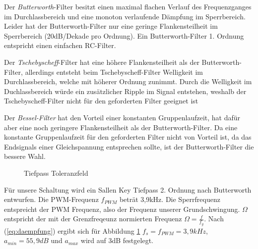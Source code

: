 Der \emph{Butterworth}-Filter besitzt einen maximal flachen Verlauf des Frequenzganges im Durchlassbereich und eine monoton verlaufende Dämpfung im Sperrbereich.
Leider hat der Butterworth-Filter nur eine geringe Flankensteilheit im Sperrbereich (20dB/Dekade pro Ordnung). Ein Butterworth-Filter 1. Ordnung entspricht einen  einfachen RC-Filter.

Der \emph{Tschebyscheff}-Filter hat eine höhere Flankensteilheit als der Butterworth-Filter, allerdings entsteht beim Tschebyscheff-Filter Welligkeit im Durchlassbereich,
welche mit höherer Ordnung zunimmt. Durch die Welligkeit im Duchlassbereich würde ein zusätzlicher Ripple im Signal entstehen, weshalb der Tschebyscheff-Filter nicht
für den geforderten Filter geeignet ist 

Der \emph{Bessel-Filter} hat den Vorteil einer konstanten Gruppenlaufzeit, hat dafür aber eine noch geringere Flankensteilheit als der Butterworth-Filter.
Da eine konstante Gruppenlaufzeit für den geforderten Filter nicht von Vorteil ist, da das Endsignals einer Gleichspannung entsprechen sollte, ist der Butterworth-Filter
die bessere Wahl.


\begin{figure}[H]
\centering
{}
\caption{Tiefpass Toleranzfeld}%
\label{fig:analog}
\end{figure}



Für unsere Schaltung wird ein Sallen Key Tiefpass 2. Ordnung nach Butterworth entwurfen. Die PWM-Frequenz $f_{PWM}$ beträt 3,9kHz.
Die Sperrfrequenz entspreicht der PWM Frequenz, also der Frequenz unserer Grundschwingung. $\Omega$ entspricht der mit der Grenzfreqeunz 
normierten Frequenz $\Omega=\frac{f}{f_g}$. Nach (\ref{eq:daempfung}) ergibt sich für Abbildung \ref{fig:analog}
$f_s=f_{PWM}=3,9 kHz$, $a_{min}=55,9 dB$ und $a_{max}$ wird auf 3dB festgelegt.






